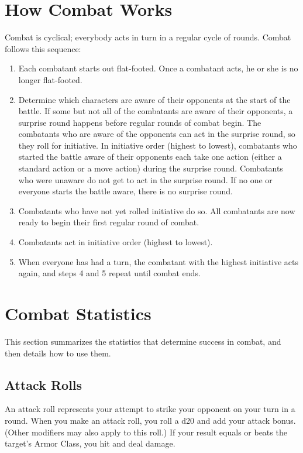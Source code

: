 \section{How Combat Works}
Combat is cyclical; everybody acts in turn in a regular cycle of rounds. Combat follows this sequence:
\vspace*{10pt}
\begin{enumerate}
	\item{Each combatant starts out flat-footed. Once a combatant acts, he or she is no longer flat-footed.}
	\item{Determine which characters are aware of their opponents at the start of the battle. If some but not all of the combatants are aware of their opponents, a surprise round happens before regular rounds of combat begin. The combatants who are aware of the opponents can act in the surprise round, so they roll for initiative. In initiative order (highest to lowest), combatants who started the battle aware of their opponents each take one action (either a standard action or a move action) during the surprise round. Combatants who were unaware do not get to act in the surprise round. If no one or everyone starts the battle aware, there is no surprise round.}
	\item{Combatants who have not yet rolled initiative do so. All combatants are now ready to begin their first regular round of combat.}
	\item{Combatants act in initiative order (highest to lowest).}
	\item{When everyone has had a turn, the combatant with the highest initiative acts again, and steps 4 and 5 repeat until combat ends.}
\end{enumerate}

\section{Combat Statistics}

This section summarizes the statistics that determine success in combat, and then details how to use them.

\subsection{Attack Rolls}
An attack roll represents your attempt to strike your opponent on your turn in a round. When you make an attack roll, you roll a d20 and add your attack bonus. (Other modifiers may also apply to this roll.) If your result equals or beats the target's Armor Class, you hit and deal damage.


